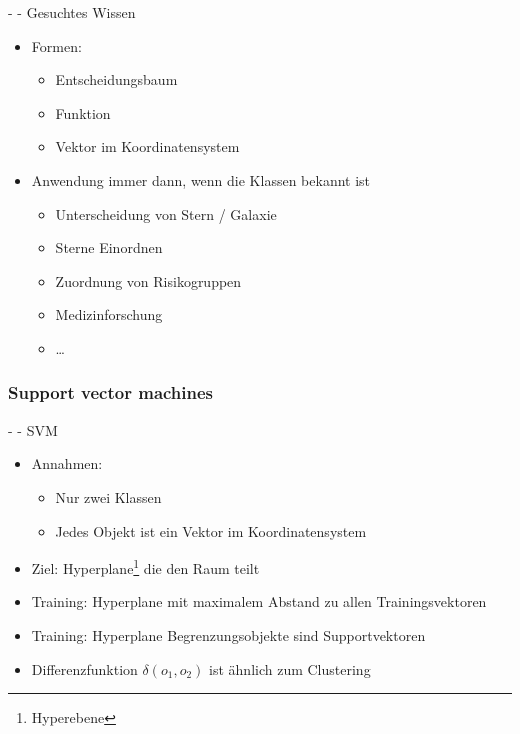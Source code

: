 \documentclass[fleqn,11pt,aspectratio=43]{beamer}
\begin{document}
\begin{frame}{\insertsectionhead - \insertsubsectionhead - Gesuchtes Wissen\cite{ester2000knowledge}}
\begin{itemize}
\item Formen:
\begin{itemize}
\item Entscheidungsbaum %
\item Funktion %
\item Vektor im Koordinatensystem
\end{itemize}
\item Anwendung immer dann, wenn die Klassen bekannt ist
\begin{itemize}
\item Unterscheidung von Stern / Galaxie
\item Sterne Einordnen
\item Zuordnung von Risikogruppen
\item Medizinforschung
\item \dots
\end{itemize}
\end{itemize}
\end{frame}

\subsubsection{Support vector machines}\label{svm}

\begin{frame}{\insertsectionhead - \insertsubsectionhead - SVM\cite{dwh}}
\begin{itemize}
\item Annahmen:
\begin{itemize}
\item Nur zwei Klassen
\item Jedes Objekt ist ein Vektor im Koordinatensystem
\end{itemize}
\item Ziel:  Hyperplane\footnote{Hyperebene} die den Raum teilt 
\item Training: Hyperplane mit maximalem Abstand zu allen Trainingsvektoren
\item Training: Hyperplane Begrenzungsobjekte sind Supportvektoren
\item Differenzfunktion $\delta(o_1, o_2)$ ist ähnlich zum Clustering
\end{itemize}
\end{frame}
\end{document}
